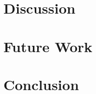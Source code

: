\documentclass[a4paper]{report}
\begin{document}
\chapter{Discussion}
\label{chap:discussion}


\chapter{Future Work}
\label{chap:future}


\chapter{Conclusion}






\newpage



\appendix

\end{document}
